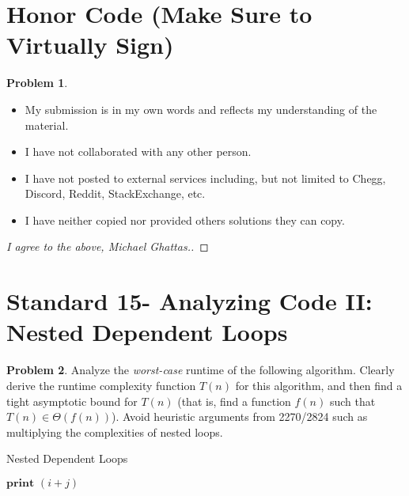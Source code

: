 \documentclass[11pt]{article}
\theoremstyle{definition}
\theoremstyle{definition}
\newtheorem{required}{Problem}
\theoremstyle{definition}
\begin{document}
\section{Honor Code (Make Sure to Virtually Sign)} \label{HonorCode}

\begin{required}
\noindent 
\begin{itemize}
\item My submission is in my own words and reflects my understanding of the material.
\item I have not collaborated with any other person.
\item I have not posted to external services including, but not limited to Chegg, Discord, Reddit, StackExchange, etc.
\item I have neither copied nor provided others solutions they can copy.
\end{itemize}

\end{required}

\begin{proof}[I agree to the above, Michael Ghattas.]
\end{proof}


\newpage
\section{Standard 15- Analyzing Code II: Nested Dependent Loops}
\begin{required}
Analyze the \textit{worst-case} runtime of the following algorithm. Clearly derive the runtime complexity function $T(n)$ for this algorithm, and then find a tight asymptotic bound for $T(n)$ (that is, find a function $f(n)$ such that $T(n) \in \Theta(f(n))$). Avoid heuristic arguments from 2270/2824 such as multiplying the complexities of nested loops. 

\begin{algorithm}
\caption{Nested Dependent Loops}\label{alg:NestedIndependent}
\begin{algorithmic}[1]
		\State $\textbf{print } (i + j)$
	\EndFor
\EndFor
\EndProcedure
\end{algorithmic}
\end{algorithm}
\end{required}
\end{document}
